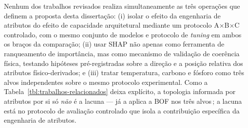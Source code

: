 Nenhum dos trabalhos revisados realiza simultaneamente as três operações que definem a proposta desta dissertação: (i) isolar o efeito da engenharia de atributos do efeito de capacidade arquitetural mediante um protocolo A×B×C controlado, com o mesmo conjunto de modelos e protocolo de \textit{tuning} em ambos os braços da comparação; (ii) usar SHAP não apenas como ferramenta de ranqueamento de importância, mas como mecanismo de validação de coerência física, testando hipóteses pré-registradas sobre a direção e a posição relativa dos atributos físico-derivados; e (iii) tratar temperatura, carbono e fósforo como três alvos independentes sobre o mesmo protocolo experimental. Como a Tabela~\ref{tbl:trabalhos-relacionados} deixa explícito, a topologia informada por atributos por si só \emph{não} é a lacuna — \citeauthor{bae2020bof} já a aplica a BOF nos três alvos\,\cite{bae2020bof}; a lacuna está no protocolo de avaliação controlado que isola a contribuição específica da engenharia de atributos.

